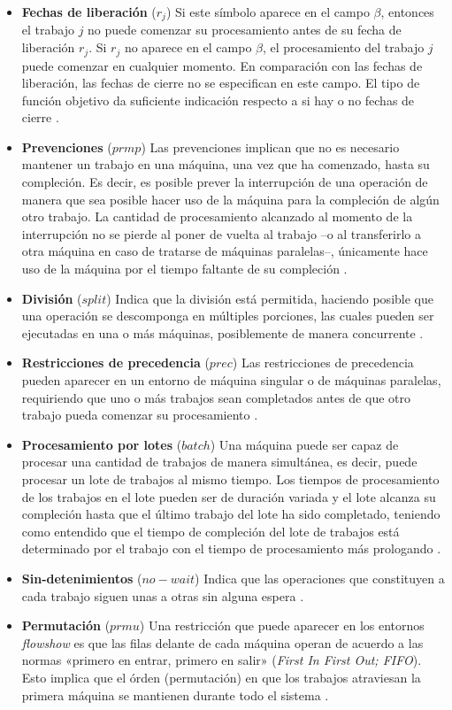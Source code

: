\documentclass[spanish,draft,12pt,headsepline,footsepline,paper=letter]{scrreprt}
\begin{document}
\begin{itemize}
  \item \textbf{Fechas de liberación} ($r_j$) Si este símbolo aparece en el campo $\beta$, entonces el trabajo $j$ no puede comenzar su procesamiento antes de su fecha de liberación $r_j$. Si $r_j$ no aparece en el campo $\beta$, el procesamiento del trabajo $j$ puede comenzar en cualquier momento. En comparación con las fechas de liberación, las fechas de cierre no se especifican en este campo. El tipo de función objetivo da suficiente indicación respecto a si hay o no fechas de cierre \citep[p.~16]{Pinedo1995}.
  \item \textbf{Prevenciones} ($prmp$) Las prevenciones implican que no es necesario mantener un trabajo en una máquina, una vez que ha comenzado, hasta su compleción. Es decir, es posible prever la interrupción de una operación de manera que sea posible hacer uso de la máquina para la compleción de algún otro trabajo. La cantidad de procesamiento alcanzado al momento de la interrupción no se pierde al poner de vuelta al trabajo –o al transferirlo a otra máquina en caso de tratarse de máquinas paralelas–, únicamente hace uso de la máquina por el tiempo faltante de su compleción \citep[p.~16, p.~10]{Pinedo1995,TKindt2002}.
  \item \textbf{División} ($split$) Indica que la división está permitida, haciendo posible que una operación se descomponga en múltiples porciones, las cuales pueden ser ejecutadas en una o más máquinas, posiblemente de manera concurrente \citep[p.~10]{TKindt2002}.
  \item \textbf{Restricciones de precedencia} ($prec$) Las restricciones de precedencia pueden aparecer en un entorno de máquina singular o de máquinas paralelas, requiriendo que uno o más trabajos sean completados antes de que otro trabajo pueda comenzar su procesamiento \citep[p.~16]{Pinedo1995}.
  \item \textbf{Procesamiento por lotes} ($batch$) Una máquina puede ser capaz de procesar una cantidad de trabajos de manera simultánea, es decir, puede procesar un lote de trabajos al mismo tiempo. Los tiempos de procesamiento de los trabajos en el lote pueden ser de duración variada y el lote alcanza su compleción hasta que el último trabajo del lote ha sido completado, teniendo como entendido que el tiempo de compleción del lote de trabajos está determinado por el trabajo con el tiempo de procesamiento más prologando \citep[p.~16]{Pinedo1995}.
  \item \textbf{Sin-detenimientos} ($no-wait$) Indica que las operaciones que constituyen a cada trabajo siguen unas a otras sin alguna espera \citep[p.~11]{TKindt2002}.
  \item \textbf{Permutación} ($prmu$) Una restricción que puede aparecer en los entornos \textit{flowshow} es que las filas delante de cada máquina operan de acuerdo a las normas «primero en entrar, primero en salir» (\textit{First In First Out; FIFO}). Esto implica que el órden (permutación) en que los trabajos atraviesan la primera máquina se mantienen durante todo el sistema \citep[p.~17]{Pinedo1995}.
\end{itemize}
\end{document}
